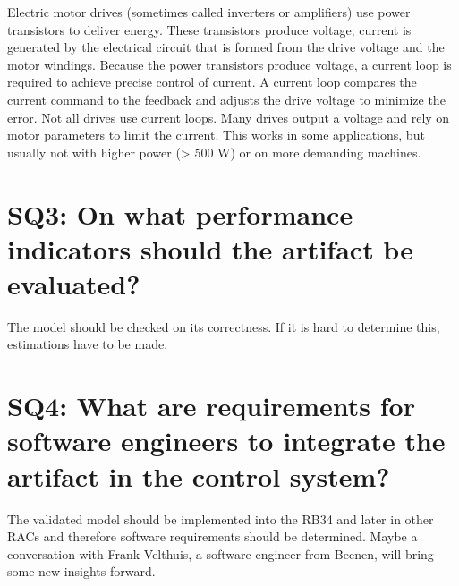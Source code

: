 Electric motor drives (sometimes called inverters or amplifiers) use power transistors to deliver energy. These transistors produce voltage; current is generated by the electrical circuit that is formed from the drive voltage and the motor windings. Because the power transistors produce voltage, a current loop is required to achieve precise control of current. A current loop compares the current command to the feedback and adjusts the drive voltage to minimize the error. Not all drives use current loops. Many drives output a voltage and rely on motor parameters to limit the current. This works in some applications, but usually not with higher power (> 500 W) or on more demanding machines.

\section{SQ3: On what performance indicators should the artifact be evaluated?} \label{SQ3}
The model should be checked on its correctness. If it is hard to determine this, estimations have to be made.
\section{SQ4: What are requirements for software engineers to integrate the artifact in the control system?} \label{SQ4}
The validated model should be implemented into the RB34 and later in other RACs and therefore software requirements should be determined. Maybe a conversation with Frank Velthuis, a software engineer from Beenen, will bring some new insights forward.
